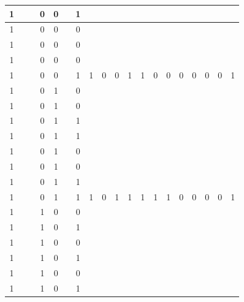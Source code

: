 \begin{table}[!tb]
\begin{tabular}{|c|c|c|c|c|c|c|c|c|c|c|c|c|c|c|c|c|c|c|}
        \rowcolor{yellow!40} 1 &  &  & 0 & 0 &  & 1 &  &  &  &  &  &  &  &  &  &  &  &  \\ \hline
        \rowcolor{yellow!40} 1 &  &  & 0 & 0 &  & 0 &  &  &  &  &  &  &  &  &  &  &  &  \\ \hline
        \rowcolor{yellow!40} 1 &  &  & 0 & 0 &  & 0 &  &  &  &  &  &  &  &  &  &  &  &  \\ \hline
        \rowcolor{yellow!40} 1 &  &  & 0 & 0 &  & 0 &  &  &  &  &  &  &  &  &  &  &  &  \\ \hline
        \rowcolor{yellow!40} 1 &  &  & 0 & 0 &  & 1 & 1 & 0 & 0 & 1 & 1 & 0 & 0 & 0 & 0 & 0 & 0 & 1 \\ \hline
        \rowcolor{gray!40} 1 &  &  & 0 & 1 &  & 0 &  &  &  &  &  &  &  &  &  &  &  &  \\ \hline
        \rowcolor{gray!40} 1 &  &  & 0 & 1 &  & 0 &  &  &  &  &  &  &  &  &  &  &  &  \\ \hline
        \rowcolor{gray!40} 1 &  &  & 0 & 1 &  & 1 &  &  &  &  &  &  &  &  &  &  &  &  \\ \hline
        \rowcolor{gray!40} 1 &  &  & 0 & 1 &  & 1 &  &  &  &  &  &  &  &  &  &  &  &  \\ \hline
        \rowcolor{gray!40} 1 &  &  & 0 & 1 &  & 0 &  &  &  &  &  &  &  &  &  &  &  &  \\ \hline
        \rowcolor{gray!40} 1 &  &  & 0 & 1 &  & 0 &  &  &  &  &  &  &  &  &  &  &  &  \\ \hline
        \rowcolor{gray!40} 1 &  &  & 0 & 1 &  & 1 &  &  &  &  &  &  &  &  &  &  &  &  \\ \hline
        \rowcolor{gray!40} 1 &  &  & 0 & 1 &  & 1 & 1 & 0 & 1 & 1 & 1 & 1 & 1 & 0 & 0 & 0 & 0 & 1 \\ \hline
        \rowcolor{blue!40} 1 &  &  & 1 & 0 &  & 0 &  &  &  &  &  &  &  &  &  &  &  &  \\ \hline
        \rowcolor{blue!40} 1 &  &  & 1 & 0 &  & 1 &  &  &  &  &  &  &  &  &  &  &  &  \\ \hline
        \rowcolor{blue!40} 1 &  &  & 1 & 0 &  & 0 &  &  &  &  &  &  &  &  &  &  &  &  \\ \hline
        \rowcolor{blue!40} 1 &  &  & 1 & 0 &  & 1 &  &  &  &  &  &  &  &  &  &  &  &  \\ \hline
        \rowcolor{blue!40} 1 &  &  & 1 & 0 &  & 0 &  &  &  &  &  &  &  &  &  &  &  &  \\ \hline
        \rowcolor{blue!40} 1 &  &  & 1 & 0 &  & 1 &  &  &  &  &  &  &  &  &  &  &  &  \\ \hline

\end{tabular}
\end{table}
